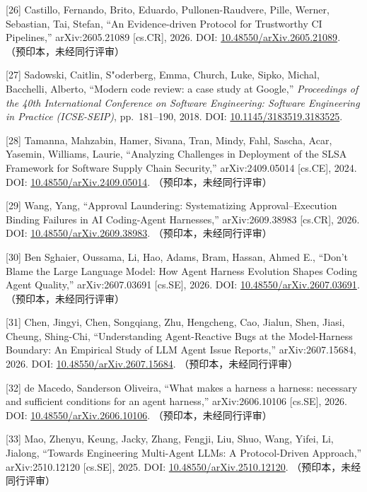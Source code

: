 \documentclass[
]{article}
\begin{document}
{[}26{]} Castillo, Fernando, Brito, Eduardo, Pullonen-Raudvere, Pille,
Werner, Sebastian, Tai, Stefan, ``An Evidence-driven Protocol for
Trustworthy CI Pipelines,'' arXiv:2605.21089 {[}cs.CR{]}, 2026. DOI:
\href{https://doi.org/10.48550/arXiv.2605.21089}{10.48550/arXiv.2605.21089}.
（预印本，未经同行评审）

{[}27{]} Sadowski, Caitlin, S"oderberg, Emma, Church, Luke, Sipko,
Michal, Bacchelli, Alberto, ``Modern code review: a case study at
Google,'' \emph{Proceedings of the 40th International Conference on
Software Engineering: Software Engineering in Practice (ICSE-SEIP)},
pp.~181--190, 2018. DOI:
\href{https://doi.org/10.1145/3183519.3183525}{10.1145/3183519.3183525}.

{[}28{]} Tamanna, Mahzabin, Hamer, Sivana, Tran, Mindy, Fahl, Sascha,
Acar, Yasemin, Williams, Laurie, ``Analyzing Challenges in Deployment of
the SLSA Framework for Software Supply Chain Security,''
arXiv:2409.05014 {[}cs.CE{]}, 2024. DOI:
\href{https://doi.org/10.48550/arXiv.2409.05014}{10.48550/arXiv.2409.05014}.
（预印本，未经同行评审）

{[}29{]} Wang, Yang, ``Approval Laundering: Systematizing
Approval--Execution Binding Failures in AI Coding-Agent Harnesses,''
arXiv:2609.38983 {[}cs.CR{]}, 2026. DOI:
\href{https://doi.org/10.48550/arXiv.2609.38983}{10.48550/arXiv.2609.38983}.
（预印本，未经同行评审）

{[}30{]} Ben Sghaier, Oussama, Li, Hao, Adams, Bram, Hassan, Ahmed E.,
``Don't Blame the Large Language Model: How Agent Harness Evolution
Shapes Coding Agent Quality,'' arXiv:2607.03691 {[}cs.SE{]}, 2026. DOI:
\href{https://doi.org/10.48550/arXiv.2607.03691}{10.48550/arXiv.2607.03691}.
（预印本，未经同行评审）

{[}31{]} Chen, Jingyi, Chen, Songqiang, Zhu, Hengcheng, Cao, Jialun,
Shen, Jiasi, Cheung, Shing-Chi, ``Understanding Agent-Reactive Bugs at
the Model-Harness Boundary: An Empirical Study of LLM Agent Issue
Reports,'' arXiv:2607.15684, 2026. DOI:
\href{https://doi.org/10.48550/arXiv.2607.15684}{10.48550/arXiv.2607.15684}.
（预印本，未经同行评审）

{[}32{]} de Macedo, Sanderson Oliveira, ``What makes a harness a
harness: necessary and sufficient conditions for an agent harness,''
arXiv:2606.10106 {[}cs.SE{]}, 2026. DOI:
\href{https://doi.org/10.48550/arXiv.2606.10106}{10.48550/arXiv.2606.10106}.
（预印本，未经同行评审）

{[}33{]} Mao, Zhenyu, Keung, Jacky, Zhang, Fengji, Liu, Shuo, Wang,
Yifei, Li, Jialong, ``Towards Engineering Multi-Agent LLMs: A
Protocol-Driven Approach,'' arXiv:2510.12120 {[}cs.SE{]}, 2025. DOI:
\href{https://doi.org/10.48550/arXiv.2510.12120}{10.48550/arXiv.2510.12120}.
（预印本，未经同行评审）
\end{document}
